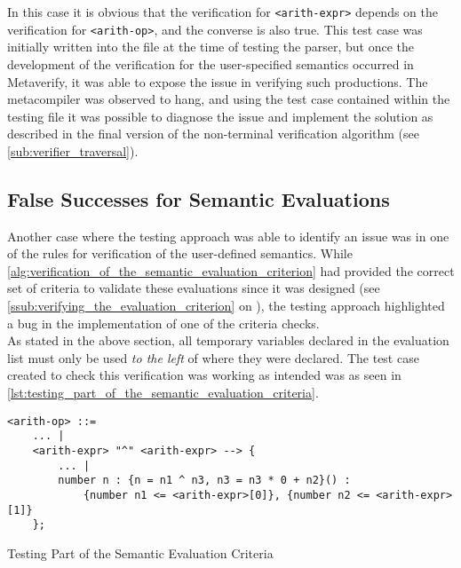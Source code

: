 In this case it is obvious that the verification for \texttt{<arith-expr>} depends on the verification for \texttt{<arith-op>}, and the converse is also true. 
This test case was initially written into the file at the time of testing the parser, but once the development of the verification for the user-specified semantics occurred in Metaverify, it was able to expose the issue in verifying such productions.
The metacompiler was observed to hang, and using the test case contained within the testing file it was possible to diagnose the issue and implement the solution as described in the final version of the non-terminal verification algorithm (see \autoref{sub:verifier_traversal}).


\subsection{False Successes for Semantic Evaluations} %
\label{sub:false_successes_for_semantic_evaluations}
Another case where the testing approach was able to identify an issue was in one of the rules for verification of the user-defined semantics. 
While \autoref{alg:verification_of_the_semantic_evaluation_criterion} had provided the correct set of criteria to validate these evaluations since it was designed (see \autoref{ssub:verifying_the_evaluation_criterion} on ), the testing approach highlighted a bug in the implementation of one of the criteria checks.\\

As stated in the above section, all temporary variables declared in the evaluation list must only be used \textit{to the left} of where they were declared. 
The test case created to check this verification was working as intended was as seen in \autoref{lst:testing_part_of_the_semantic_evaluation_criteria}.

\begin{listing}[!htb]
\begin{verbatim}
<arith-op> ::= 
    ... |
    <arith-expr> "^" <arith-expr> --> {
        ... |
        number n : {n = n1 ^ n3, n3 = n3 * 0 + n2}() :
            {number n1 <= <arith-expr>[0]}, {number n2 <= <arith-expr>[1]}
    };
\end{verbatim}
\caption{Testing Part of the Semantic Evaluation Criteria}
\label{lst:testing_part_of_the_semantic_evaluation_criteria}
\end{listing}

